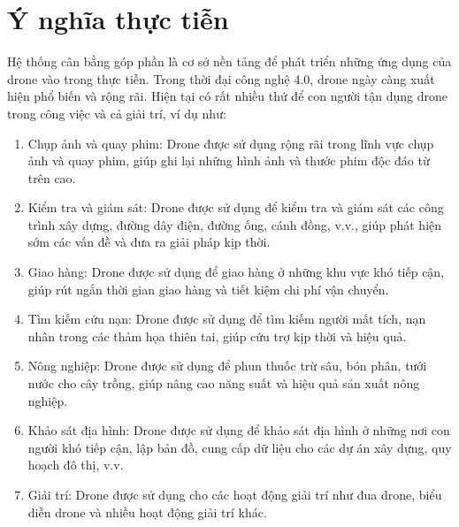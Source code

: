 \section{Ý nghĩa thực tiễn}
\tab Hệ thống cân bằng góp phần là cơ sở nền tảng để phát triển những ứng dụng của drone vào trong thực tiễn. Trong thời đại công nghệ 4.0, drone ngày càng xuất hiện phổ biến và rộng rãi. Hiện tại có rất nhiều thứ để con người tận dụng drone trong công việc và cả giải trí, ví dụ như: 
\begin{enumerate}
    \item Chụp ảnh và quay phim: Drone được sử dụng rộng rãi trong lĩnh vực chụp ảnh và quay phim, giúp ghi lại những hình ảnh và thước phim độc đáo từ trên cao.
    \item Kiểm tra và giám sát: Drone được sử dụng để kiểm tra và giám sát các công trình xây dựng, đường dây điện, đường ống, cánh đồng, v.v., giúp phát hiện sớm các vấn đề và đưa ra giải pháp kịp thời.
    \item Giao hàng: Drone được sử dụng để giao hàng ở những khu vực khó tiếp cận, giúp rút ngắn thời gian giao hàng và tiết kiệm chi phí vận chuyển.
    \item Tìm kiếm cứu nạn: Drone được sử dụng để tìm kiếm người mất tích, nạn nhân trong các thảm họa thiên tai, giúp cứu trợ kịp thời và hiệu quả.
    \item Nông nghiệp: Drone được sử dụng để phun thuốc trừ sâu, bón phân, tưới nước cho cây trồng, giúp nâng cao năng suất và hiệu quả sản xuất nông nghiệp.
    \item Khảo sát địa hình: Drone được sử dụng để khảo sát địa hình ở những nơi con người khó tiếp cận, lập bản đồ, cung cấp dữ liệu cho các dự án xây dựng, quy hoạch đô thị, v.v.
    \item Giải trí: Drone được sử dụng cho các hoạt động giải trí như đua drone, biểu diễn drone và nhiều hoạt động giải trí khác.
\end{enumerate}
\newpage

